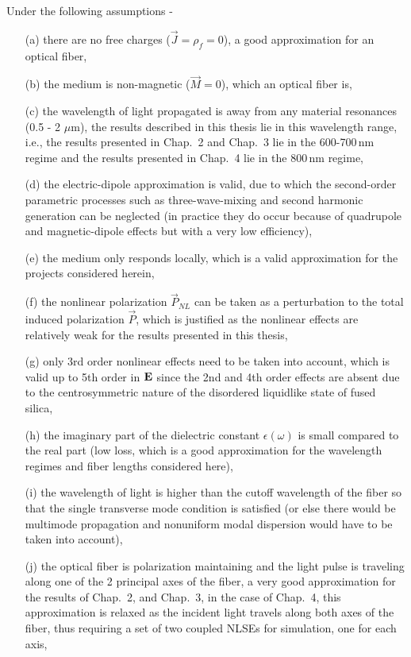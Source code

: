 Under the following assumptions \cite{Agrawal2} -
\begin{enumerate}
\item[(a)]
there are no free charges ($\vec{J}=\rho_{f}=0$), a good approximation for an optical fiber, 
\item[(b)] the medium is non-magnetic ($\vec{M}=0$), which an optical fiber is,
\item[(c)] the wavelength of light propagated is away from any material
resonances (0.5 - 2 $\mu$m), the results described in this thesis lie in this wavelength range, i.e., the results presented in Chap.\ 2 and Chap.\ 3 lie in the 600-700\,nm regime and the results presented in Chap.\ 4 lie in the 800\,nm regime,
\item[(d)] the electric-dipole approximation is valid, due to which the second-order parametric processes such as three-wave-mixing and second harmonic generation can be neglected (in practice they do occur because of quadrupole and magnetic-dipole effects but with a very low efficiency),
\item[(e)] the medium only responds locally, which is a valid approximation for the projects considered herein,
\item[(f)] the nonlinear polarization $\vec{P}_{NL}$ can be taken as a
perturbation to the total induced polarization $\vec{P}$, which is justified as the nonlinear effects are relatively weak for the results presented in this thesis,
\item[(g)] only 3rd order nonlinear effects need to be taken into
account, which is valid up to 5th order in ${\bf E}$ since the 2nd and 4th order effects are absent due to the centrosymmetric nature of the disordered liquidlike state of fused silica,
\item[(h)] the imaginary part of the dielectric constant
$\epsilon(\omega)$ is small compared to the real part (low loss, which is a good approximation for the wavelength regimes and fiber lengths considered here),
\item[(i)] the wavelength of light is higher than the cutoff wavelength
of the fiber so that the single transverse mode condition is satisfied (or else there would be multimode propagation and nonuniform modal dispersion would have to be taken into account),
\item[(j)] the optical fiber is polarization maintaining and the light
pulse is traveling along one of the 2 principal axes of the fiber, a very good approximation for the results of Chap.\ 2, and Chap.\ 3, in the case of Chap.\ 4, this approximation is relaxed as the incident light travels along both axes of the fiber, thus requiring a set of two coupled NLSEs for simulation, one for each axis,

\end{enumerate}
